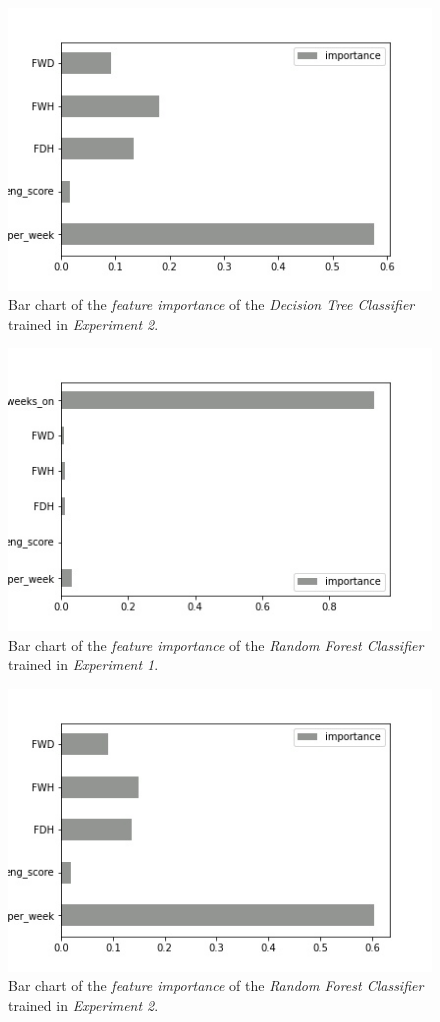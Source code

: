 \documentclass[sigplan,screen]{acmart}
\begin{document}
 \begin{figure}[h]
     \centering
     \includegraphics[width=0.5\linewidth]{reports/figures/feature_importance_dc_2.jpg}
     \caption{Bar chart of the \emph{feature importance} of the \emph{Decision Tree Classifier} trained in \emph{Experiment 2}.}
     \label{fig:fi_dc_2}
 \end{figure}

 \begin{figure}[h]
     \centering
     \includegraphics[width=0.5\linewidth]{reports/figures/feature_importance_rf_1.jpg}
     \caption{Bar chart of the \emph{feature importance} of the \emph{Random Forest Classifier} trained in \emph{Experiment 1}.}
     \label{fig:fi_rf_1}
 \end{figure}
 
 \begin{figure}[h]
     \centering
     \includegraphics[width=0.5\linewidth]{reports/figures/feature_importance_rf_2.jpg}
     \caption{Bar chart of the \emph{feature importance} of the \emph{Random Forest Classifier} trained in \emph{Experiment 2}.}
     \label{fig:fi_rf_2}
 \end{figure}
 
\end{document}
